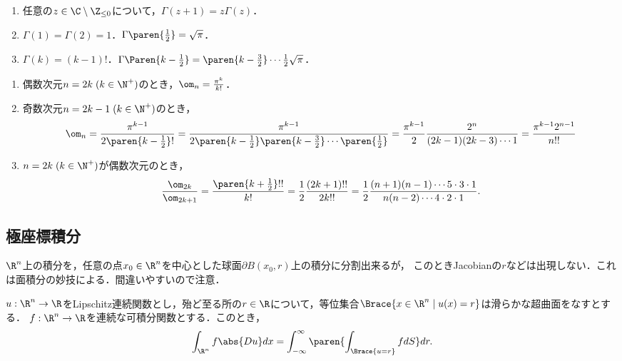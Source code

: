 \documentclass[uplatex,dvipdfmx]{jsreport}
\begin{document}
\begin{lemma}[Gamma関数の性質]\mbox{}
    \begin{enumerate}
        \item 任意の$z\in\C\setminus\Z_{\le0}$について，$\Gamma(z+1)=z\Gamma(z)$．
        \item $\Gamma(1)=\Gamma(2)=1$．$\Gamma\paren{\frac{1}{2}}=\sqrt{\pi}$．
        \item $\Gamma(k)=(k-1)!$．$\Gamma\Paren{k-\frac{1}{2}}=\paren{k-\frac{3}{2}}\cdots\frac{1}{2}\sqrt{\pi}$．
    \end{enumerate}
\end{lemma}


\begin{corollary}\mbox{}\label{cor-volume-of-ball-in-odd-and-even-dimension}
    \begin{enumerate}
        \item 偶数次元$n=2k\;(k\in\N^+)$のとき，$\om_n=\frac{\pi^k}{k!}$．
        \item 奇数次元$n=2k-1\;(k\in\N^+)$のとき，
        \[\om_n=\frac{\pi^{k-1}}{2\paren{k-\frac{1}{2}}!}=\frac{\pi^{k-1}}{2\paren{k-\frac{1}{2}}\paren{k-\frac{3}{2}}\cdots\paren{\frac{1}{2}}}=\frac{\pi^{k-1}}{2}\frac{2^n}{(2k-1)(2k-3)\cdots 1}=\frac{\pi^{k-1}2^{n-1}}{n!!}\]
        \item $n=2k\;(k\in\N^+)$が偶数次元のとき，
        \[\frac{\om_{2k}}{\om_{2k+1}}=\frac{\paren{k+\frac{1}{2}}!!}{k!}=\frac{1}{2}\frac{(2k+1)!!}{2k!!}=\frac{1}{2}\frac{(n+1)(n-1)\cdots5\cdot3\cdot1}{n(n-2)\cdots4\cdot2\cdot1}.\]
    \end{enumerate}
\end{corollary}

\subsection{極座標積分}

\begin{tcolorbox}[colframe=ForestGreen, colback=ForestGreen!10!white,breakable,colbacktitle=ForestGreen!40!white,coltitle=black,fonttitle=\bfseries\sffamily,
title=]
    $\R^n$上の積分を，任意の点$x_0\in\R^n$を中心とした球面$\partial B(x_0,r)$上の積分に分割出来るが，
    このときJacobianの$r$などは出現しない．これは面積分の妙技による．間違いやすいので注意．
\end{tcolorbox}

\begin{theorem}
    $u:\R^n\to\R$をLipschitz連続関数とし，殆ど至る所の$r\in\R$について，等位集合$\Brace{x\in\R^n\mid u(x)=r}$は滑らかな超曲面をなすとする．
    $f:\R^n\to\R$を連続な可積分関数とする．このとき，
    \[\int_{\R^n}f\abs{Du}dx=\int^\infty_{-\infty}\paren{\int_{\Brace{u=r}}fdS}dr.\]
\end{theorem}
\end{document}
